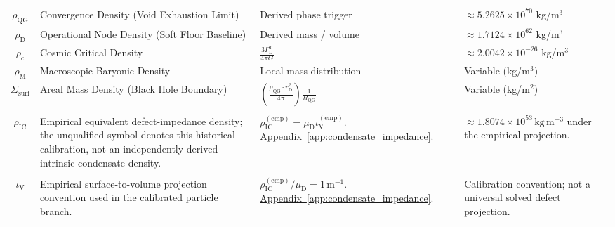 \begin{longtable}{@{} c p{5.5cm} p{4cm} p{3.5cm} @{}}
$\rho_{\mathrm{QG}}$ & Convergence Density (Void Exhaustion Limit) & Derived phase trigger & $\approx 5.2625 \times 10^{70}$ kg/m$^3$ \\

$\rho_{\mathrm{D}}$ & Operational Node Density (Soft Floor Baseline) & Derived mass / volume & $\approx 1.7124 \times 10^{62}$ kg/m$^3$ \\

$\rho_{\mathrm{c}}$ & Cosmic Critical Density & $\frac{3\Gamma_{\mathrm{D}}^2}{4\pi G}$ & $\approx 2.0042 \times 10^{-26}$ kg/m$^3$ \\

$\rho_{\mathrm{M}}$ & Macroscopic Baryonic Density & Local mass distribution & Variable (kg/m$^3$) \\

$\Sigma_{\mathrm{surf}}$ & Areal Mass Density (Black Hole Boundary) & $\left( \frac{\rho_{\mathrm{QG}} \cdot r_{\mathrm{D}}^2}{4\pi} \right) \frac{1}{R_{\mathrm{QG}}}$ & Variable (kg/m$^2$) \\

\begin{tabular}[c]{@{}c@{}}$\rho_{\mathrm{IC}}^{(\mathrm{emp})}$ \\ $\rho_{\mathrm{IC}}$\end{tabular} & {\raggedright Empirical equivalent defect-impedance density; the unqualified symbol denotes this historical calibration, not an independently derived intrinsic condensate density.\par} & {\raggedright $\rho_{\mathrm{IC}}^{(\mathrm{emp})}=\mu_{\mathrm D}\iota_{\mathrm V}^{(\mathrm{emp})}$. \newline \hyperref[app:condensate_impedance]{Appendix~\ref*{app:condensate_impedance}}.\par} & {\raggedright $\approx1.8074\times10^{53}\,\mathrm{kg\,m^{-3}}$ under the empirical projection.\par} \\

\begin{tabular}[c]{@{}c@{}}$\iota_{\mathrm V}^{(\mathrm{emp})}$ \\ $\iota_{\mathrm V}$\end{tabular} & {\raggedright Empirical surface-to-volume projection convention used in the calibrated particle branch.\par} & {\raggedright $\rho_{\mathrm{IC}}^{(\mathrm{emp})}/\mu_{\mathrm D}=1\,\mathrm{m^{-1}}$. \newline \hyperref[app:condensate_impedance]{Appendix~\ref*{app:condensate_impedance}}.\par} & {\raggedright Calibration convention; not a universal solved defect projection.\par} \\


\end{longtable}
